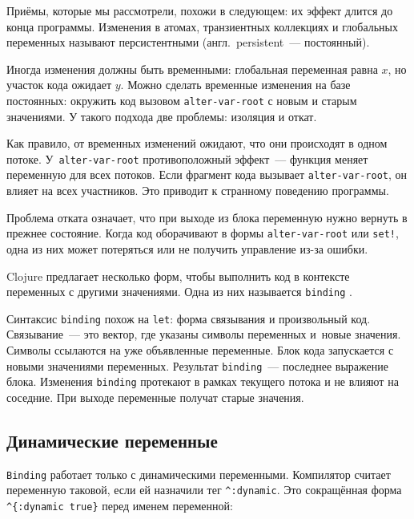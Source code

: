 
Приёмы, которые мы рассмотрели, похожи в следующем: их эффект длится до конца
программы. Изменения в атомах, транзиентных коллекциях и глобальных переменных
называют персистентными (англ.~persistent~--- постоянный).

Иногда изменения должны быть временными: глобальная переменная равна $x$, но
участок кода ожидает $y$. Можно сделать временные изменения на базе постоянных:
окружить код вызовом \verb|alter-var-root| с новым и старым значениями. У
такого подхода две проблемы: изоляция и откат.


Как правило, от временных изменений ожидают, что они происходят в одном
потоке. У~\texttt{alter\--var\--root} противоположный эффект~--- функция меняет
переменную для всех потоков. Если фрагмент кода вызывает \verb|alter-var-root|,
он влияет на всех участников. Это приводит к странному поведению программы.

Проблема отката означает, что при выходе из блока переменную нужно вернуть в прежнее
состояние. Когда код оборачивают в формы \verb|alter-var-root| или \verb|set!|, одна
из них может потеряться или не получить управление из-за ошибки.

Clojure предлагает несколько форм, чтобы выполнить код в контексте переменных с
другими значениями. Одна из них называется \verb|binding| .


Синтаксис \verb|binding| похож на \verb|let|: форма связывания и произвольный
код. Связывание~--- это вектор, где указаны символы переменных и~новые
значения. Символы ссылаются на уже объявленные переменные. Блок кода запускается
с новыми значениями переменных. Результат \verb|binding|~--- последнее выражение
блока. Изменения \verb|binding| протекают в рамках текущего потока и не влияют
на соседние. При выходе переменные получат старые значения.

\subsection{Динамические переменные}

\label{dynamic-vars}


\verb|Binding| работает только с динамическими переменными. Компилятор считает
переменную таковой, если ей назначили тег \verb|^:dynamic|. Это сокращённая
форма \verb|^{:dynamic true}| перед именем переменной:

